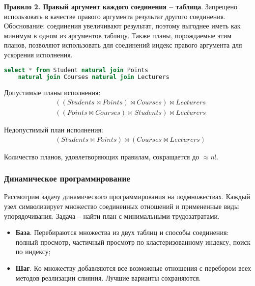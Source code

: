 \textbf{Правило 2. Правый аргумент каждого соединения -- таблица}. Запрещено использовать в
качестве правого аргумента результат другого соединения. Обоснование: соединения увеличивают
результат, поэтому выгоднее иметь как минимум в одном из аргументов таблицу. Также планы,
порождаемые этим планов, позволяют использовать для соединений индекс правого аргумента для
ускорения исполнения.

\begin{example}
	\enewline
	\begin{lstlisting}[language=SQL]
    select * from Student natural join Points
    natural join Courses natural join Lecturers
    \end{lstlisting}

	Допустимые планы исполнения:
	\begin{align}
		 & ((Students \bowtie Points) \bowtie Courses) \bowtie Lecturers \\
		 & ((Points \bowtie Courses) \bowtie Students) \bowtie Lecturers
	\end{align}

	Недопустимый план исполнения:
	\begin{align}
		 & (Students \bowtie Points) \bowtie (Courses \bowtie Lecturers)
	\end{align}
\end{example}

\begin{remark}
	Количество планов, удовлетворяющих правилам, сокращается до $\approx n!$.
\end{remark}

\subsubsection{Динамическое программирование}

Рассмотрим задачу динамического программирования на подмножествах. Каждый узел символизирует
множество соединенных отношений и примененные виды упорядочивания. Задача -- найти план с
минимальными трудозатратами.

\begin{itemize}
	\item \textbf{База}. Перебираются множества из двух таблиц и способы соединения: полный
	      просмотр, частичный просмотр по кластеризованному индексу, поиск по индексу;
	\item \textbf{Шаг}. Ко множеству добавляются все возможные отношения с перебором всех методов
	      реализации слияния. Лучшие варианты сохраняются.
\end{itemize}

